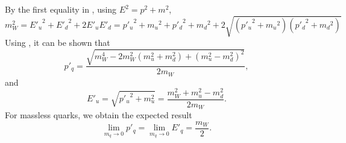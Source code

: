 \documentclass[12pt]{article}
\begin{document}
By the first equality in , using $E^{2} = p^{2}+m^{2}$,
\begin{equation}
  m_W^2 = {E'_u}^{2} + {E'_d}^{2} + 2E'_uE'_d
  = {p'_u}^2 + {m_u}^2 + {p'_d}^2 + {m_d}^2 + 2\sqrt{({p'_u}^2 + {m_u}^2) ({p'_d}^2 + {m_d}^2)}
\end{equation}
%
\def\massroot{\sqrt{ m_W^4 - 2m_W^2(m_u^2+m_d^2) + (m_u^2-m_d^2)^2 }}
Using , it can be shown that
\begin{equation}
  p'_q = \frac{\massroot}{2m_W},
\end{equation}
and
\begin{equation}
  E'_u = \sqrt{{p'_u}^2 + m_u^2} = \frac{m_W^2 + m_u^2 - m_d^2}{2m_W}.
\end{equation}
%
For massless quarks, we obtain the expected result
\begin{equation}
  \lim_{m_q\rightarrow 0} p'_q = \lim_{m_q\rightarrow 0} E'_q = \frac{m_W}{2}.
\end{equation}


\end{document}
